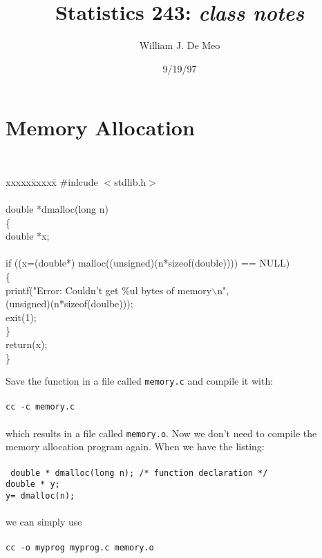 \documentclass{article}
\begin{document}
\title{Statistics 243: \emph{class notes}}
\author{William J. De Meo}
\date{9/19/97}
\maketitle

\section{Memory Allocation}
{\tt
\begin{tabbing}
xxxxx\=xxxxx\= \kill
\#inlcude $<$stdlib.h$>$\>\>\\
\>\>\\
double *dmalloc(long n)\>\>\\
\{\>\>\\
\>double *x;\>\\
\>\>\\
\>if ((x=(double*) malloc((unsigned)(n*sizeof(double)))) == NULL)\>\\
\>\{\>\\
\>\>printf("Error: Couldn't get \%ul bytes of memory$\backslash$n",\\ 
\>\>(unsigned)(n*sizeof(doulbe)));\\
\>\>exit(1);\\
\>\}\>\\
return(x);\>\>\\
\}\>\>
\end{tabbing}
}
\noindent Save the function in a file called {\tt memory.c} 
and compile it with:\\\\
{\tt cc -c memory.c}\\\\
which results in a file called {\tt memory.o}.
Now we don't need to compile the memory allocation program again.
When we have the listing:\\\\
{\tt
double * dmalloc(long n); /* function declaration */\\
double * y;\\
y= dmalloc(n);}\\\\
we can simply use \\
\\
{\tt cc -o myprog myprog.c memory.o}\\
\end{document}
